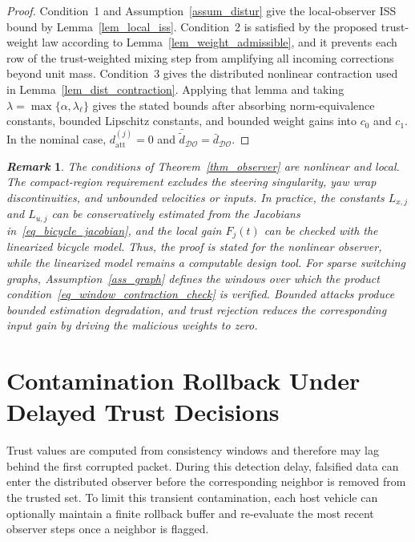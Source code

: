 \documentclass[journal,twoside]{IEEEtran}
\def\DO{\mathcal{DO}} %
\newtheorem{remark}{\it Remark}%
\begin{document}
\begin{proof}
Condition~1 and Assumption~\ref{assum_distur} give the local-observer ISS bound by Lemma~\ref{lem_local_iss}. Condition~2 is satisfied by the proposed trust-weight law according to Lemma~\ref{lem_weight_admissible}, and it prevents each row of the trust-weighted mixing step from amplifying all incoming corrections beyond unit mass. Condition~3 gives the distributed nonlinear contraction used in Lemma~\ref{lem_dist_contraction}. Applying that lemma and taking $\lambda=\max\{\alpha,\lambda_{\ell}\}$ gives the stated bounds after absorbing norm-equivalence constants, bounded Lipschitz constants, and bounded weight gains into $c_0$ and $c_1$. In the nominal case, $d_{\mathrm{att}}^{(j)}=0$ and $\bar{\tilde d}_{\DO}=\bar d_{\DO}$.
\end{proof}

\begin{remark}
The conditions of Theorem~\ref{thm_observer} are nonlinear and local. The compact-region requirement excludes the steering singularity, yaw wrap discontinuities, and unbounded velocities or inputs. In practice, the constants $L_{x,j}$ and $L_{u,j}$ can be conservatively estimated from the Jacobians in~\eqref{eq_bicycle_jacobian}, and the local gain $F_j(t)$ can be checked with the linearized bicycle model. Thus, the proof is stated for the nonlinear observer, while the linearized model remains a computable design tool. For sparse switching graphs, Assumption~\ref{ass_graph} defines the windows over which the product condition~\eqref{eq_window_contraction_check} is verified. Bounded attacks produce bounded estimation degradation, and trust rejection reduces the corresponding input gain by driving the malicious weights to zero.
\end{remark}

\section{Contamination Rollback Under Delayed Trust Decisions}\label{sec_rollback}
Trust values are computed from consistency windows and therefore may lag behind the first corrupted packet. During this detection delay, falsified data can enter the distributed observer before the corresponding neighbor is removed from the trusted set. To limit this transient contamination, each host vehicle can optionally maintain a finite rollback buffer and re-evaluate the most recent observer steps once a neighbor is flagged.
\end{document}
